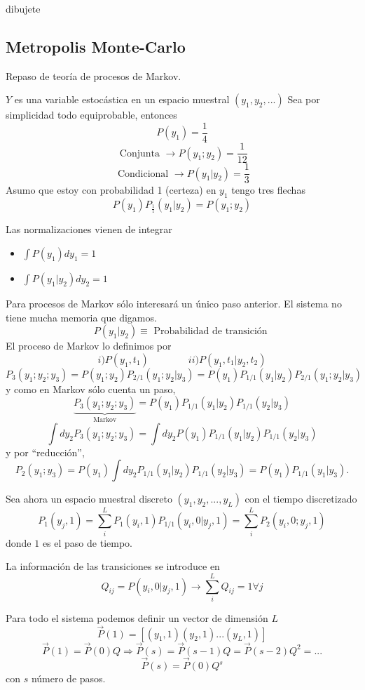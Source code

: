 \documentclass[10pt,oneside]{CBFT_book}
\begin{document}
dibujete

\subsection{Metropolis Monte-Carlo}

Repaso de teoría de procesos de Markov.

$Y$ es una variable estocástica en un espacio muestral $(y_1, y_2,...)$
Sea por simplicidad todo equiprobable, entonces
\[
	P(y_1) = \frac{1}{4}
\]
\[
	\text{ Conjunta } \rightarrow P(y_1;y_2) = \frac{1}{12}
\]
\[
	\text{ Condicional } \rightarrow P(y_1|y_2) = \frac{1}{3}
\]
Asumo que estoy con probabilidad 1 (certeza) en $y_1$ tengo tres flechas
\[ 
	P(y_1) P_{\frac{1}{1}}(y_1|y_2) = P(y_1;y_2)
\]

Las normalizaciones vienen de integrar
\begin{itemize}
 \item $ \int P(y_1) dy_1 = 1 $
 \item $ \int P(y_1|y_2) dy_2 = 1 $
\end{itemize}

Para procesos de Markov sólo interesará un único paso anterior. El sistema no tiene mucha memoria que 
digamos.
\[
	P(y_1|y_2) \equiv \text{ Probabilidad de transición }
\]
El proceso de Markov lo definimos por 
\[
	i) P(y_1,t_1) \qquad \qquad ii) P(y_1,t_1|y_2,t_2)
\]
\[
	P_3(y_1;y_2;y_3) = P(y_1;y_2) P_{2/1}(y_1;y_2|y_3) = P(y_1) P_{1/1}(y_1|y_2) P_{2/1}(y_1;y_2|y_3) 
\]
y como en Markov sólo cuenta un paso,
\[
	\underbrace{P_3(y_1;y_2;y_3)}_{\text{Markov}} = P(y_1) P_{1/1}(y_1|y_2) P_{1/1}(y_2|y_3)
\]
\[
	\int dy_2 P_3(y_1;y_2;y_3) = \int dy_2 P(y_1) P_{1/1}(y_1|y_2) P_{1/1}(y_2|y_3)
\]
y por ``reducción'',
\[
	P_2(y_1;y_3) = P(y_1) \int dy_2 P_{1/1}(y_1|y_2) P_{1/1}(y_2|y_3) = P(y_1) P_{1/1}(y_1|y_3).
\]

Sea ahora un espacio muestral discreto $(y_1,y_2,...,y_L)$ con el tiempo discretizado
\[
	P_1(y_j,1) = \sum_i^L P_1(y_i,1) P_{1/1}(y_i,0|y_j,1) = \sum_i^L P_2(y_i,0 ; y_j,1)
\]
donde $1$ es el paso de tiempo.

La información de las transiciones se introduce en 
\[
	Q_{ij} = P(y_i,0|y_j,1) \rightarrow \sum_i^L Q_{ij} = 1 \forall j 
\]

Para todo el sistema podemos definir un vector de dimensión $L$
\[
	\vec{P}(1) = [ (y_1,1) (y_2,1) ... (y_L,1 )]
\]
\[
	\vec{P}(1) = \vec{P}(0) Q \Rightarrow  \vec{P}(s) = \vec{P}(s-1) Q = \vec{P}(s-2) Q^2 = ...
\]
\[
	\vec{P}(s) = \vec{P}(0) Q^s
\]
con $s$ número de pasos.
\end{document}
